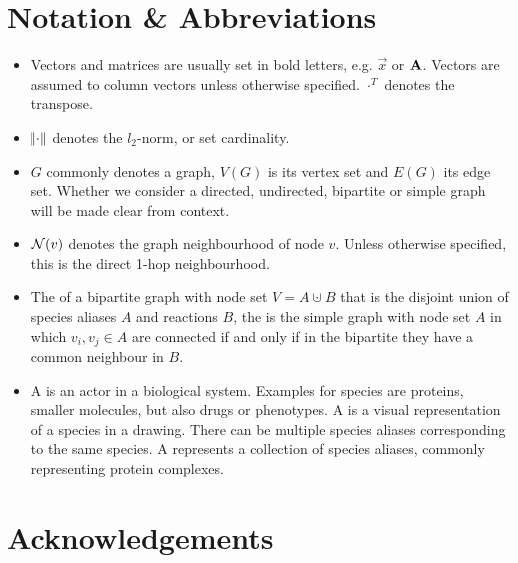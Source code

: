 \documentclass[
	fontsize=10pt, %
	twoside=false, %
	secnumdepth=1, %
  toc=indentunnumbered %
]{kaobook}
\begin{document}



\section{Notation \& Abbreviations  }
\begin{itemize}
\item Vectors and matrices are usually set in bold letters, e.g. $\vec x$ or
  $\mathbf{A}$. Vectors are assumed to column vectors unless otherwise specified.
  $\cdot^T$ denotes the transpose.
\item $\norm{\cdot}$ denotes the $l_2$-norm, or set cardinality.
\item $G$ commonly denotes a graph, $V(G)$ is its vertex set and $E(G)$ its edge
  set. Whether we consider a directed, undirected, bipartite or simple graph
  will be made clear from context.
\item $\mathcal{N}(v)$ denotes the graph neighbourhood of node $v$. Unless otherwise
  specified, this is the direct 1-hop neighbourhood.
\item The  of a bipartite graph with node set $V = A
  \cupdot B$ that is the disjoint union of species aliases $A$ and reactions
  $B$, the  is the simple graph with node set
  $A$ in which $v_i, v_j \in A$ are connected if and only if in the bipartite
  they have a common neighbour in $B$.
\item A  is an actor in a biological system. Examples for species
  are proteins, smaller molecules, but also drugs or phenotypes. A  is a visual representation of a species in a drawing. There can be
  multiple species aliases corresponding to the same species. A  represents a collection of species aliases, commonly
  representing protein complexes.
\end{itemize}




\section{Acknowledgements}



\end{document}
